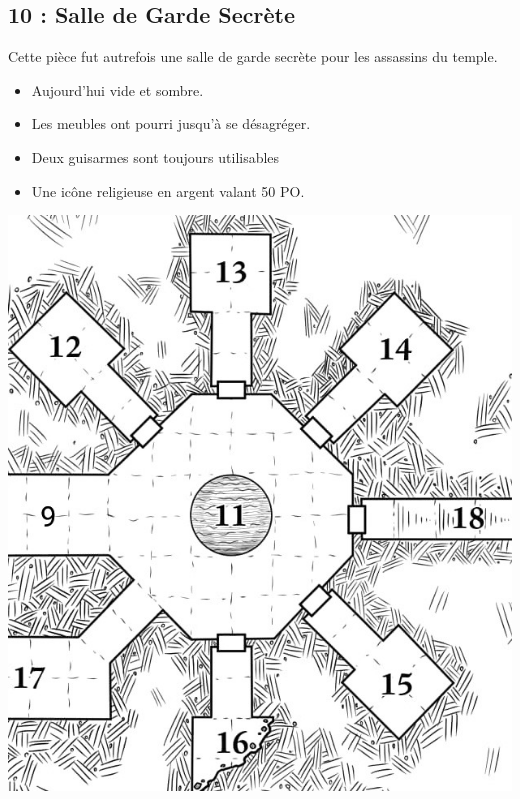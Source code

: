 \vfill\break
\subsection{10 : Salle de Garde Secrète}\label{n2:s10}
Cette pièce fut autrefois une salle de garde secrète pour
les assassins du temple.

\begin{itemize}
  \item Aujourd'hui vide et sombre.
  \item Les meubles ont pourri jusqu’à se désagréger.
  \item Deux guisarmes sont toujours utilisables
  \item Une icône religieuse en argent valant 50 PO.
\end{itemize}

\newpage
\includegraphics[width=\columnwidth]{pics/map_11-18.jpg}

